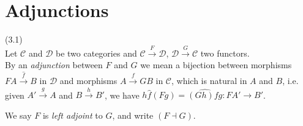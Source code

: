 \documentclass[a4paper]{article}
\begin{document}
\newpage

\section{Adjunctions}
\begin{defi} (3.1)\\
    Let $\mathcal{C}$ and $\mathcal{D}$ be two categories and $\mathcal{C} \xrightarrow{F} \mathcal{D}$, $\mathcal{D} \xrightarrow{G} \mathcal{C}$ two functors.\\
    By an \emph{adjunction} between $F$ and $G$ we mean a bijection between morphisms $FA \xrightarrow{\hat{f}} B$ in $\mathcal{D}$ and morphisms $A \xrightarrow{f} GB$ in $\mathcal{C}$, which is natural in $A$ and $B$, i.e. given $A' \xrightarrow{g} A$ and $B \xrightarrow{h} B'$, we have $h\hat{f} (Fg) = \widehat{(Gh)fg}: FA' \to B'$.\\


    We say $F$ is \emph{left adjoint} to $G$, and write $(F \dashv G)$.
\end{defi}
\end{document}

